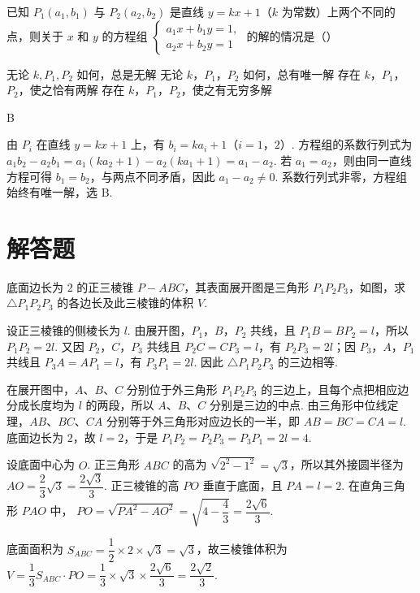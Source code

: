 \begin{problem}
已知 \( P_{1}(a_{1}, b_{1}) \) 与 \( P_{2}(a_{2}, b_{2}) \) 是直线 \( y = kx + 1 \)（\(k\) 为常数）上两个不同的点，则关于 \(x\) 和 \(y\) 的方程组 \(\begin{cases}
a_{1}x + b_{1}y = 1,\\
a_{2}x + b_{2}y = 1
\end{cases}\)
的解的情况是（\quad）

\choices
    {无论 \(k, P_{1}, P_{2}\) 如何，总是无解}
    {无论 \(k\)，\(P_{1}\)，\(P_{2}\) 如何，总有唯一解}
    {存在 \(k\)，\(P_{1}\)，\(P_{2}\)，使之恰有两解}
    {存在 \(k\)，\(P_{1}\)，\(P_{2}\)，使之有无穷多解}

\begin{answer}
B
\end{answer}

\begin{solution}
由 \(P_i\) 在直线 \(y=kx+1\) 上，有 \(b_i=ka_i+1\)（\(i=1\)，\(2\)）. 方程组的系数行列式为 \(a_1b_2-a_2b_1=a_1(ka_2+1)-a_2(ka_1+1)=a_1-a_2\). 若 \(a_1=a_2\)，则由同一直线方程可得 \(b_1=b_2\)，与两点不同矛盾，因此 \(a_1-a_2\ne0\). 系数行列式非零，方程组始终有唯一解，选 B.
\end{solution}
\end{problem}

\section{解答题}

\begin{problem}
底面边长为 \(2\) 的正三棱锥 \(P-ABC\)，其表面展开图是三角形 \(P_{1}P_{2}P_{3}\)，如图，求 \(\triangle P_{1}P_{2}P_{3}\) 的各边长及此三棱锥的体积 \(V\).


\begin{solution}
设正三棱锥的侧棱长为 \(l\). 由展开图，\(P_1\)，\(B\)，\(P_2\) 共线，且 \(P_1B=BP_2=l\)，所以 \(P_1P_2=2l\). 又因 \(P_2\)，\(C\)，\(P_3\) 共线且 \(P_2C=CP_3=l\)，有 \(P_2P_3=2l\)；因 \(P_3\)，\(A\)，\(P_1\) 共线且 \(P_3A=AP_1=l\)，有 \(P_3P_1=2l\). 因此 \(\triangle P_1P_2P_3\) 的三边相等.

在展开图中，\(A\)、\(B\)、\(C\) 分别位于外三角形 \(P_1P_2P_3\) 的三边上，且每个点把相应边分成长度均为 \(l\) 的两段，所以 \(A\)、\(B\)、\(C\) 分别是三边的中点. 由三角形中位线定理，\(AB\)、\(BC\)、\(CA\) 分别等于外三角形对应边长的一半，即 \(AB=BC=CA=l\). 底面边长为 \(2\)，故 \(l=2\)，于是 \(P_1P_2=P_2P_3=P_3P_1=2l=4\).

设底面中心为 \(O\). 正三角形 \(ABC\) 的高为 \(\sqrt{2^2-1^2}=\sqrt3\)，所以其外接圆半径为 \(AO=\dfrac23\sqrt3=\dfrac{2\sqrt3}{3}\). 正三棱锥的高 \(PO\) 垂直于底面，且 \(PA=l=2\). 在直角三角形 \(PAO\) 中，
\(PO=\sqrt{PA^2-AO^2}=\sqrt{4-\dfrac43}=\dfrac{2\sqrt6}{3}\).

底面面积为 \(S_{ABC}=\dfrac12\times2\times\sqrt3=\sqrt3\)，故三棱锥体积为
\(V=\dfrac13S_{ABC}\cdot PO=\dfrac13\times\sqrt3\times\dfrac{2\sqrt6}{3}=\dfrac{2\sqrt2}{3}\).
\end{solution}
\end{problem}

